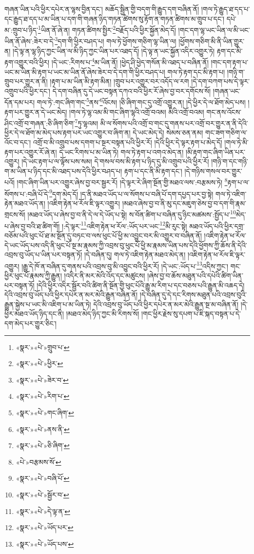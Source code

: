 གཞན་ཡིན་པའི་ཕྱིར་དཔེར་ན་ལྷས་བྱིན་དང་། མཆོད་སྦྱིན་གྱི་བདག་གི་རྒྱུད་དག་བཞིན་ནོ། །གལ་ཏེ་རྒྱུད་ཐ་དད་པ་དང་རྒྱུད་ཐ་དད་པ་མ་ཡིན་པ་དག་གི་གཞན་ཉིད་གཏན་ཚིགས་སུ་རྟོག་ན་གཏན་ཚིགས་མ་གྲུབ་པ་དང་། དཔེ་མ་:གྲུབ་པ་ཉིད་\footnote{«སྣར་»«པེ་»གྲུབ་པ་}ཡིན་ནོ་ཞེ་ན། གཏན་ཚིགས་སྤྱིར་\footnote{«སྣར་»«པེ་»ཕྱིར་}བརྗོད་པའི་ཕྱིར་སྐྱོན་མེད་དོ། །གང་དག་ལྷ་ཡང་ཡིན་ལ་མི་ཡང་ཡིན་ནོ་ཞེས་:ཟེར་བ་དེ་\footnote{«སྣར་»«པེ་»ཟེར་བ་}དག་གི་ཕྱིར་བཤད་པ། གལ་ཏེ་ཕྱོགས་གཅིག་ལྷ་ཡིན་ལ། །ཕྱོགས་གཅིག་མི་ནི་ཡིན་གྱུར་ན། །དེ་ལྟ་ན་ལྷ་ཉིད་ཀྱང་ཡིན་ལ་མི་ཉིད་ཀྱང་ཡིན་པར་འཐད་དོ། །དེ་ལྟ་ན་ཡང་སྐྱོན་འདིར་འགྱུར་ཏེ། རྟག་དང་མི་རྟག་འགྱུར་བའི་ཕྱིར། །དེ་ཡང་:རིགས་པ་\footnote{«སྣར་»«པེ་»རིག་པ་}མ་ཡིན་ནོ། །ཕྱེད་ཤི་ཕྱེད་གསོན་མི་འཐད་པ་བཞིན་ནོ། །གང་དག་རྟག་པ་ཡང་མ་ཡིན་མི་རྟག་པ་ཡང་མ་ཡིན་ནོ་ཞེས་ཟེར་བ་དེ་དག་གི་ཕྱིར་བཤད་པ། གལ་ཏེ་རྟག་དང་མི་རྟག་པ། །གཉི་ག་གྲུབ་པར་གྱུར་ན་ནི། །རྟག་པ་མ་ཡིན་མི་རྟག་མིན། །གྲུབ་པར་འགྱུར་བར་འདོད་ལ་རག །དེ་དག་བཀག་པས་དེ་ལྟར་འགྲུབ་པའི་ཕྱིར་དང་། དེ་དག་བཞིན་དུ་དེ་ཡང་བསྟན་དཀའ་བའི་ཕྱིར་རོ་ཞེས་བྱ་བར་དགོངས་སོ། །གཞན་ཡང་དོན་དམ་པར། གལ་ཏེ་:གང་ཞིག་གང་\footnote{«སྣར་»«པེ་»གང་ཞིག་}ནས་\footnote{«སྣར་»«པེ་»ནས་ནི་}འོངས། །ཅི་ཞིག་གང་དུ་འགྲོ་འགྱུར་ན། །དེ་ཕྱིར་དེ་ལ་ཐོག་མེད་པས། །རྟག་པར་གྱུར་ན་དེ་ཡང་མེད། །གལ་ཏེ་ལྷ་འམ་མི་གང་ཞིག་ལྷའི་འགྲོ་བའམ། མིའི་འགྲོ་བའམ། གང་ནས་འོངས་ཤིང་འགྲོ་བ་གཞན་:ཅི་ཞིག་ཅིག་\footnote{«སྣར་»«པེ་»ཅི་ཞིག་}ཏུ་ལྷའམ། མི་ལ་སོགས་པའི་འགྲོ་བ་གང་དུ་གནས་པར་འགྲོ་བར་གྱུར་ན་ནི་དེའི་ཕྱིར་དེ་ལ་ཐོག་མ་མེད་པས་རྟག་པར་ཡང་འགྱུར་བ་ཞིག་ན། དེ་ཡང་མེད་དེ། སེམས་ཅན་ནམ། གང་ཟག་གཅིག་ལ་འོང་བ་དང་། འགྲོ་བ་མི་འགྲུབ་པས་དགག་པ་སྔར་བསྟན་པའི་ཕྱིར་རོ། །དེའི་ཕྱིར་དེ་ལྟར་རྟག་པ་མེད་དོ། །གལ་ཏེ་མི་རྟག་པར་འགྱུར་རོ་ཞེ་ན། དེ་ཡང་རིགས་པ་མ་ཡིན་ཏེ། གལ་ཏེ་རྟག་པ་འགའ་མེད་ན། །མི་རྟག་གང་ཞིག་ཡིན་པར་འགྱུར། །དེ་ཡང་རྟག་པ་ལ་ལྟོས་པས་སམ། དེ་གསལ་བས་མི་རྟག་པ་ཉིད་དུ་མི་འགྲུབ་པའི་ཕྱིར་རོ། །གཉི་ག་དང་གཉི་ག་མ་ཡིན་པ་ཉིད་དང་མི་འཐད་པས་དེའི་ཕྱིར་བཤད་པ། རྟག་པ་དང་ནི་མི་རྟག་དང་། །དེ་གཉིས་གསལ་བར་གྱུར་པའོ། །གང་ཞིག་ཡིན་པར་འགྱུར་ཞེས་བྱ་བར་སྦྱར་རོ། །དེ་ལྟར་རེ་ཞིག་སྔོན་གྱི་མཐའ་ལས་:བརྩམས་ཏེ། \footnote{«པེ་»བརྩམས་སོ་}རྟག་པ་ལ་སོགས་པ་:བཞི་པོ་དེ་\footnote{«སྣར་»«པེ་»བཞི་པོ་}དག་མེད་དོ། །ད་ནི་མཐའ་ཡོད་པ་ལ་སོགས་པ་བཞི་པོ་དག་དཔྱད་པར་བྱ་སྟེ། གལ་ཏེ་འཇིག་རྟེན་མཐའ་ཡོད་ན། །འཇིག་རྟེན་ཕ་རོལ་ཇི་ལྟར་འགྱུར། །མཐའ་ཞེས་བྱ་བ་ནི་མུ་དང་མཇུག་ཅེས་བྱ་བ་དག་གི་རྣམ་གྲངས་སོ། །མཐའ་ཡོད་པ་ཞེས་བྱ་བ་ནི་དེ་ལ་དེ་ཡོད་པ་སྟེ། ས་བོན་ཚིག་པ་བཞིན་དུ་ཉིང་མཚམས་:སྤྱོད་པ་\footnote{«སྣར་»«པེ་»སྦྱོར་བ་}མེད་པ་ཞེས་བྱ་བའི་ཐ་ཚིག་གོ། །:དེ་ལྟར་\footnote{«སྣར་»«པེ་»དེ་ལྟ་ན་}འཇིག་རྟེན་ཕ་རོལ་:ཡོད་པར་ཡང་\footnote{«སྣར་»«པེ་»ཡོད་པར་}མི་རུང་སྟེ། མཐའ་ཡོད་པའི་ཕྱིར་དགྲ་བཅོམ་པའི་ཕུང་པོ་ཐ་མ་སྔོན་དུ་བཏང་བ་ལས་ཕུང་པོ་ཕྱི་མ་འབྱུང་བར་མི་འགྱུར་བ་བཞིན་ནོ། །འཇིག་རྟེན་ཕ་རོལ་དེ་ཡང་ཡོད་པས་འདི་ནི་ཕུང་པོ་སྔ་མ་རྣམས་ཀྱི་འབྲས་བུ་ཕུང་པོ་ཕྱི་མ་རྣམས་ཡིན་པས་དེའི་ཕྱོགས་ཀྱི་ཆོས་ནི་དེའི་འབྲས་བུ་ཡོད་པ་ཡིན་པར་བསྟན་ཏོ། །དེ་བཞིན་དུ། གལ་ཏེ་འཇིག་རྟེན་མཐའ་མེད་ན། །འཇིག་རྟེན་ཕ་རོལ་ཇི་ལྟར་འགྱུར། །རྒྱུ་དེ་ཁོ་ན་བཞིན་དུ་གནས་པའི་འབྲས་བུ་མི་འབྱུང་བའི་ཕྱིར་རོ། །དེ་ཡང་:ཡོད་པ་\footnote{«སྣར་»«པེ་»ཡོད་པས་}འདིས་ཀྱང་། གང་ཕྱིར་ཕུང་པོ་རྣམས་ཀྱི་རྒྱུན། །འདིར་ནི་མར་མེའི་འོད་དང་མཚུངས། །ཞེས་བྱ་བ་ཆོས་མཐུན་པའི་དཔེའི་ཚིག་ཡིན་པར་བསྟན་ཏོ། །དེའི་ཕྱིར་འདིར་སྦྱོར་བའི་ཚིག་ནི་སྔོན་གྱི་ཕུང་པོའི་རྒྱུ་མ་རིག་པ་དང་བཅས་པའི་རྒྱུན་མི་འཆད་དེ། དེའི་འབྲས་བུ་ཡོད་པའི་ཕྱིར་དཔེར་ན་མར་མེའི་རྒྱུན་བཞིན་ནོ། །དེ་བཞིན་དུ་དེ་དང་རིགས་མཐུན་པའི་འབྲས་བུའི་རྒྱུན་སྐྱེས་པ་ཡང་མི་འཇིག་པ་མ་ཡིན་ཏེ། དེའི་འབྲས་བུ་ཡོད་པའི་ཕྱིར་དཔེར་ན་མར་མེའི་རྒྱུན་སྔ་མ་བཞིན་ནོ། །དེ་ཕྱིར་མཐའ་ཡོད་ཉིད་དང་ནི། །མཐའ་མེད་ཉིད་ཀྱང་མི་རིགས་སོ། །གང་ཕྱིར་རྗེས་སུ་དཔག་པ་ཇི་སྐད་བསྟན་པ་དེ་དག་མེད་པར་གྱུར་ཅིང་། 